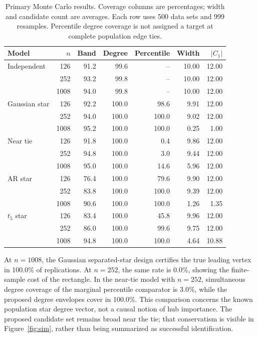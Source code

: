 \documentclass[pdflatex,sn-mathphys-ay]{sn-jnl}
\theoremstyle{thmstyleone}
\theoremstyle{thmstyletwo}
\begin{document}
\begin{table}[t]
\caption{Primary Monte Carlo results. Coverage columns are percentages; width and candidate count are averages. Each row uses 500 data sets and 999 resamples. Percentile degree coverage is not assigned a target at complete population edge ties.}\label{tab:sim}
\centering\small
\begin{tabular}{@{}lrrrrrr@{}}\toprule
Model & $n$ & Band & Degree & Percentile & Width & $|C_1|$\\\midrule
Independent & 126 & 91.2 & 99.6 & -- & 10.00 & 12.00\\
 & 252 & 93.2 & 99.8 & -- & 10.00 & 12.00\\
 & 1008 & 94.0 & 99.8 & -- & 10.00 & 12.00\\
\addlinespace
Gaussian star & 126 & 92.2 & 100.0 & 98.6 & 9.91 & 12.00\\
 & 252 & 94.0 & 100.0 & 100.0 & 9.02 & 12.00\\
 & 1008 & 95.2 & 100.0 & 100.0 & 0.25 & 1.00\\
\addlinespace
Near tie & 126 & 91.8 & 100.0 & 0.4 & 9.86 & 12.00\\
 & 252 & 94.8 & 100.0 & 3.0 & 9.44 & 12.00\\
 & 1008 & 95.0 & 100.0 & 14.6 & 5.96 & 12.00\\
\addlinespace
AR star & 126 & 76.4 & 100.0 & 79.6 & 9.90 & 12.00\\
 & 252 & 83.8 & 100.0 & 100.0 & 9.39 & 12.00\\
 & 1008 & 90.6 & 100.0 & 100.0 & 1.26 & 1.35\\
\addlinespace
$t_5$ star & 126 & 83.4 & 100.0 & 45.8 & 9.96 & 12.00\\
 & 252 & 86.0 & 100.0 & 99.6 & 9.75 & 12.00\\
 & 1008 & 94.8 & 100.0 & 100.0 & 4.64 & 10.88\\
\bottomrule\end{tabular}
\end{table}

At $n=1008$, the Gaussian separated-star design certifies the true leading vertex in 100.0\% of replications. At $n=252$, the same rate is 0.0\%, showing the finite-sample cost of the rectangle. In the near-tie model with $n=252$, simultaneous degree coverage of the marginal percentile comparator is 3.0\%, while the proposed degree envelopes cover in 100.0\%. This comparison concerns the known population star degree vector, not a causal notion of hub importance. The proposed candidate set remains broad near the tie; that conservatism is visible in Figure~\ref{fig:sim}, rather than being summarized as successful identification.
\end{document}
